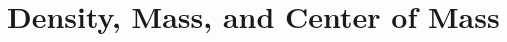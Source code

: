\section{Density, Mass, and Center of Mass} \label{S:6.3.Mass}



\newpage



\newpage



\newpage




\newpage

\clearpage
